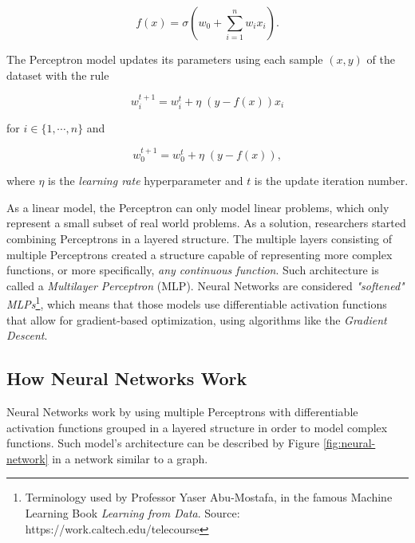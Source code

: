 \begin{equation}
    f(x) = \sigma(w_0 + \sum_{i = 1}^{n} w_i x_i).
    \label{eq:perceptron}
\end{equation}

The Perceptron model updates its parameters using each sample \((x, y)\) of the dataset with the rule

\begin{equation}
    w_i^{t + 1} = w_i^t + \eta \; (y - f(x)) x_i
    \label{eq:perceptron_update}  
\end{equation}

for \(i \in \{1, \cdots, n\}\) and

\begin{equation}
    w_0^{t + 1} = w_0^t + \eta \; (y - f(x)),  
\end{equation}

where \(\eta\) is the \emph{learning rate} hyperparameter and \(t\) is the update iteration number.

As a linear model, the Perceptron can only model linear problems, which only represent a small subset of real world problems.
As a solution, researchers started combining Perceptrons in a layered structure. 
The multiple layers consisting of multiple Perceptrons created a structure capable of representing more complex functions, or more specifically, \emph{any continuous function}.
Such architecture is called a \emph{Multilayer Perceptron} (MLP). Neural Networks are considered \emph{"softened" MLPs}\footnote{Terminology used by Professor Yaser Abu-Mostafa, in the famous Machine Learning Book \emph{Learning from Data}. Source: https://work.caltech.edu/telecourse}, 
which means that those models use differentiable activation functions that allow for gradient-based optimization, using algorithms like the \emph{Gradient Descent}.

\subsection{How Neural Networks Work}

Neural Networks work by using multiple Perceptrons with differentiable activation functions grouped in a layered structure in order to model complex functions. 
Such model's architecture can be described by Figure \ref{fig:neural-network} in a network similar to a graph.

